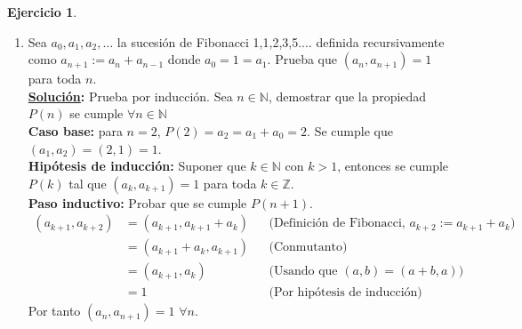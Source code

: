 \documentclass[11pt,letterpaper]{article}
\theoremstyle{definition}\newtheorem{p}{Ejercicio}
\theoremstyle{definition}\newtheorem{pp}[p]{$(*)$Ejercicio}
\numberwithin{p}{section}
\newcommand{\Z}{\mathbb{Z}}
\newcommand{\N}{\mathbb{N}}
\newcommand{\sol}{\textbf{\underline{Solución}: }} %
\begin{document}
\begin{p}
\begin{enumerate}
  \item  Sea $a_0,a_1,a_2,\ldots$ la sucesi\'on de Fibonacci 1,1,2,3,5.$\ldots$ definida recursivamente como 
  $a_{n+1}:=a_n+a_{n-1}$ donde $a_0=1=a_1$. Prueba que $(a_n,a_{n+1})=1$ para toda $n$.\\
  \sol Prueba por inducción. Sea $n \in \N$, demostrar que la propiedad $P(n)$ se cumple $\forall n \in \N$\\
  \textbf{Caso base:} para $n=2$, $P(2) = a_2 = a_1 + a_0=2$. Se cumple que $(a_1, a_2) = (2,1) = 1$.\\
  \textbf{Hipótesis de inducción:} Suponer que $k \in \N$ con $k>1$, entonces se cumple $P(k)$ tal que
   $(a_k, a_{k+1})= 1$ para toda $k \in \Z$.\\
   \textbf{Paso inductivo:} Probar que se cumple $P(n+1)$.
   \begin{align*}
   (a_{k+1}, a_{k+2})
       &= (a_{k+1}, a_{k+1} +a_k) && \text{(Definición de Fibonacci, $a_{k+2}:=a_{k+1}+a_{k}$)}\\
       &= (a_{k+1} +a_k, a_{k+1}) && \text{(Conmutanto)}\\
       &= (a_{k+1} , a_{k}) && \text{(Usando que $(a,b) = (a+b, a)$)}\\
       &= 1 && \text{(Por hipótesis de inducción)}
   \end{align*}
   Por tanto $(a_n,a_{n+1})=1$ $\forall n$.
  \end{enumerate}
\end{p}
%
\end{document}
